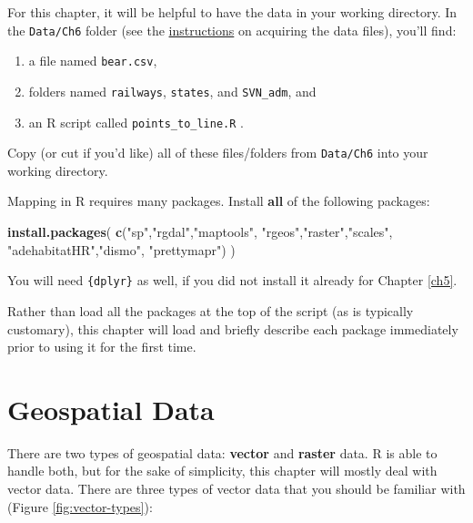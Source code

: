 \documentclass[]{book}
\newenvironment{Shaded}{\begin{snugshade}}{\end{snugshade}}
\newcommand{\KeywordTok}[1]{\textcolor[rgb]{0.13,0.29,0.53}{\textbf{#1}}}
\newcommand{\StringTok}[1]{\textcolor[rgb]{0.31,0.60,0.02}{#1}}
\newcommand{\NormalTok}[1]{#1}
\providecommand{\tightlist}{%
  \setlength{\itemsep}{0pt}\setlength{\parskip}{0pt}}
\theoremstyle{definition}
\theoremstyle{definition}
\theoremstyle{definition}
\theoremstyle{remark}
\begin{document}
For this chapter, it will be helpful to have the data in your working
directory. In the \texttt{Data/Ch6} folder (see the
\protect\hyperlink{data-sets}{instructions} on acquiring the data
files), you'll find:

\begin{enumerate}
\def\labelenumi{\arabic{enumi}.}
\tightlist
\item
  a file named \texttt{bear.csv},
\item
  folders named \texttt{railways}, \texttt{states}, and
  \texttt{SVN\_adm}, and
\item
  an R script called \texttt{points\_to\_line.R}
  \citep{points-line-cite}.
\end{enumerate}

Copy (or cut if you'd like) all of these files/folders from
\texttt{Data/Ch6} into your working directory.

Mapping in R requires many packages. Install \textbf{all} of the
following packages:

\begin{Shaded}
\begin{Highlighting}[]
\KeywordTok{install.packages}\NormalTok{(}
  \KeywordTok{c}\NormalTok{(}\StringTok{"sp"}\NormalTok{,}\StringTok{"rgdal"}\NormalTok{,}\StringTok{"maptools"}\NormalTok{,}
  \StringTok{"rgeos"}\NormalTok{,}\StringTok{"raster"}\NormalTok{,}\StringTok{"scales"}\NormalTok{,}
  \StringTok{"adehabitatHR"}\NormalTok{,}\StringTok{"dismo"}\NormalTok{, }\StringTok{"prettymapr"}\NormalTok{)}
\NormalTok{)}
\end{Highlighting}
\end{Shaded}

You will need \texttt{\{dplyr\}} \citep{R-dplyr} as well, if you did not
install it already for Chapter \ref{ch5}.

Rather than load all the packages at the top of the script (as is
typically customary), this chapter will load and briefly describe each
package immediately prior to using it for the first time.

\section{Geospatial Data}\label{intro}

There are two types of geospatial data: \textbf{vector} and
\textbf{raster} data. R is able to handle both, but for the sake of
simplicity, this chapter will mostly deal with vector data. There are
three types of vector data that you should be familiar with (Figure
\ref{fig:vector-types}):
\end{document}
